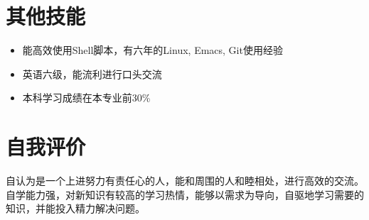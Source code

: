 \documentclass{resume}
\begin{document}
\section{其他技能}
\begin{itemize}%
\item 能高效使用Shell脚本，有六年的Linux, Emacs, Git使用经验
\item 英语六级，能流利进行口头交流
\item 本科学习成绩在本专业前30\%
\end{itemize}

\section{自我评价}
\qquad 自认为是一个上进努力有责任心的人，能和周围的人和睦相处，进行高效的交流。自学能力强，对新知识有较高的学习热情，能够以需求为导向，自驱地学习需要的知识，并能投入精力解决问题。


%  
\end{document}
